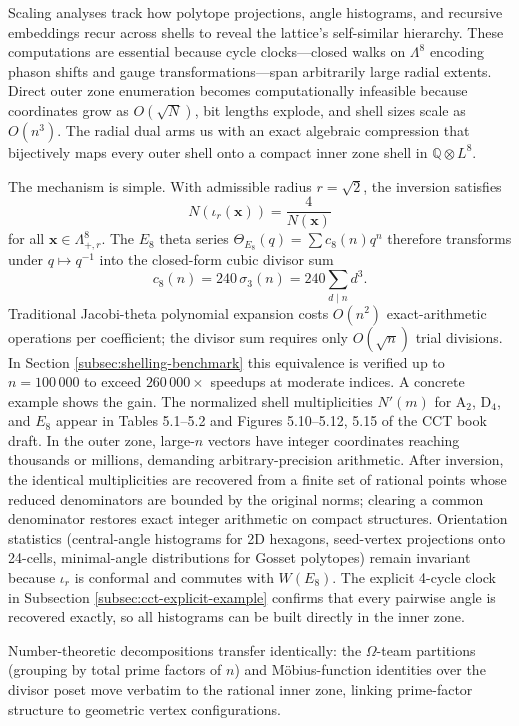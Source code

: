 \documentclass{article}
\begin{document}
Scaling analyses track how polytope projections, angle histograms, and recursive embeddings recur across shells to reveal the lattice's self-similar hierarchy.
These computations are essential because cycle clocks---closed walks on $\Lambda^8$ encoding phason shifts and gauge transformations---span arbitrarily large radial extents. Direct outer zone enumeration becomes computationally infeasible because coordinates grow as $O(\sqrt{N})$, bit lengths explode, and shell sizes scale as $O(n^3)$. The radial dual arms us with an exact algebraic compression that bijectively maps every outer shell onto a compact inner zone shell in $\mathbb{Q}\otimes L^8$.

The mechanism is simple. With admissible radius $r=\sqrt{2}$, the inversion satisfies
\[
N(\iota_r(\mathbf{x})) = \frac{4}{N(\mathbf{x})}
\]
for all $\mathbf{x}\in\Lambda_{+,r}^8$. The $E_8$ theta series $\Theta_{E_8}(q)=\sum c_8(n)q^n$ therefore transforms under $q\mapsto q^{-1}$ into the closed-form cubic divisor sum
\[
c_8(n)=240\,\sigma_3(n)=240\sum_{d\mid n}d^3.
\]
Traditional Jacobi-theta polynomial expansion costs $O(n^2)$ exact-arithmetic operations per coefficient; the divisor sum requires only $O(\sqrt{n})$ trial divisions. In Section \ref{subsec:shelling-benchmark} this equivalence is verified up to $n=100\,000$ to exceed $260\,000\times$ speedups at moderate indices.
A concrete example shows the gain. The normalized shell multiplicities $N'(m)$ for $\mathrm{A}_2$, $\mathrm{D}_4$, and $E_8$ appear in Tables 5.1--5.2 and Figures 5.10--5.12, 5.15 of the CCT book draft. In the outer zone, large-$n$ vectors have integer coordinates reaching thousands or millions, demanding arbitrary-precision arithmetic. After inversion, the identical multiplicities are recovered from a finite set of rational points whose reduced denominators are bounded by the original norms; clearing a common denominator restores exact integer arithmetic on compact structures. Orientation statistics (central-angle histograms for 2D hexagons, seed-vertex projections onto 24-cells, minimal-angle distributions for Gosset polytopes) remain invariant because $\iota_r$ is conformal and commutes with $W(E_8)$. The explicit 4-cycle clock in Subsection \ref{subsec:cct-explicit-example} confirms that every pairwise angle is recovered exactly, so all histograms can be built directly in the inner zone.

Number-theoretic decompositions transfer identically: the $\Omega$-team partitions  (grouping by total prime factors of $n$) and Möbius-function identities over the divisor poset move verbatim to the rational inner zone, linking prime-factor structure to geometric vertex configurations.
\end{document}
